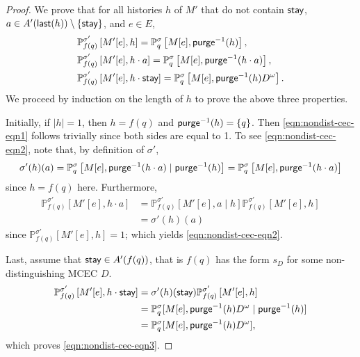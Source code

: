 \documentclass[a4paper,USenglish,cleveref, autoref, thm-restate]{lipics-v2021}
\def\abs#1{\ensuremath{\lvert #1 \rvert}}
\newcommand*{\pr}{\mathbb{P}}
\newcommand{\last}{\operatorname{\mathsf{last}}}
\newcommand\purgeinv[1]{\textrm{\sf purge}^{-1}(#1)}
\def\actionstay{\textrm{\sf stay}}
\begin{document}
\begin{proof}
  We prove that for all histories $h$ of $M'$ that do not contain $\actionstay$, $a \in A'(\last(h))\setminus\{\actionstay\}$, and $e \in E$,
  \begin{align}
    &\pr^{\sigma'}_{f(q)}\left[M'[e], h \right] = \pr^\sigma_q\left[M[e], \purgeinv{h} \right],\label{eqn:nondist-cec-eqn1}\\
    &\pr^{\sigma'}_{f(q)}\left[M'[e], h \cdot a \right] = \pr^\sigma_q\left[M[e], \purgeinv{h\cdot a} \right]\label{eqn:nondist-cec-eqn2},\\
    &\pr^{\sigma'}_{f(q)}\left[M'[e], h \cdot \actionstay \right] = \pr^\sigma_q\left[M[e], \purgeinv{h}D^\omega \right].\label{eqn:nondist-cec-eqn3}
  \end{align}
  We proceed by induction on the length of $h$ to prove the above three properties.
  
  Initially, if $\abs{h}=1$, then $h=f(q)$ and $\purgeinv{h} = \{q\}$.
  Then \eqref{eqn:nondist-cec-eqn1} follows trivially since both sides are equal to 1.
  To see \eqref{eqn:nondist-cec-eqn2}, note that, by definition of $\sigma'$,
  \[\sigma'(h)(a) = \pr^\sigma_q\left[M[e], \purgeinv{h\cdot a} \mid \purgeinv{h}\right] = \pr^\sigma_q\left[M[e], \purgeinv{h\cdot a} \right] \]
  since $h=f(q)$ here.
  Furthermore, 
  \begin{align*}
    \pr^{\sigma'}_{f(q)}\left[M'[e], h \cdot a \right]
    &=\pr^{\sigma'}_{f(q)}\left[M'[e], a \mid h \right] \pr^{\sigma'}_{f(q)}\left[M'[e], h\right]\\
    &=\sigma'(h)(a)
  \end{align*}
  since $\pr^{\sigma'}_{f(q)}\left[M'[e], h\right]=1$; which yields \eqref{eqn:nondist-cec-eqn2}.

  Last, assume that $\actionstay \in A'(f(q))$, that is $f(q)$ has the form $s_D$ for some non-distinguishing MCEC $D$.
  \begin{align*}
    \pr^{\sigma'}_{f(q)}\left[M'[e], h \cdot \actionstay \right] &= \sigma'(h)(\actionstay) \pr^{\sigma'}_{f(q)}\left[M'[e], h \right]\\
    & = \pr_q^\sigma[M[e], \purgeinv{h} D^\omega \mid \purgeinv{h}]\\
    & = \pr_q^\sigma[M[e], \purgeinv{h} D^\omega ],
  \end{align*}
  which proves \eqref{eqn:nondist-cec-eqn3}.


\end{proof}
\end{document}
